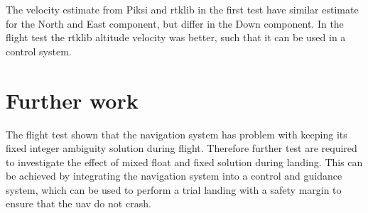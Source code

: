 
The velocity estimate from Piksi and \gls{rtklib} in the first test have similar estimate for the North and East component, but differ in the Down component. In the flight test the \gls{rtklib} altitude velocity was better, such that it can be used in a control system.
%
%
%
%
%
%
%
%
%
%
%
%
%
%
%
%
%


\section{Further work}
The flight test shown that the navigation system has problem with keeping its fixed integer ambiguity solution during flight. Therefore further test are required to investigate the effect of mixed float and fixed solution during landing. This can be achieved by integrating the navigation system into a control and guidance system, which can be used to perform a trial landing with a safety margin to ensure that the \gls{uav} do not crash.


